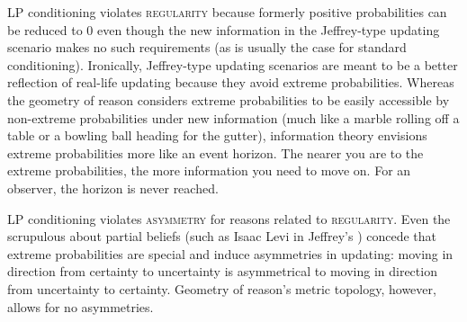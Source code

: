 \documentclass[11pt]{article} \usepackage{october}
\begin{document}
LP conditioning violates \textsc{regularity} because formerly positive
probabilities can be reduced to $0$ even though the new information in
the Jeffrey-type updating scenario makes no such requirements (as is
usually the case for standard conditioning). Ironically, Jeffrey-type
updating scenarios are meant to be a better reflection of real-life
updating because they avoid extreme probabilities. Whereas the
geometry of reason considers extreme probabilities to be easily
accessible by non-extreme probabilities under new information (much
like a marble rolling off a table or a bowling ball heading for the
gutter), information theory envisions extreme probabilities more like
an event horizon. The nearer you are to the extreme probabilities, the
more information you need to move on. For an observer, the horizon is
never reached.

LP conditioning violates \textsc{asymmetry} for reasons related to
\textsc{regularity}. Even the scrupulous about partial beliefs (such
as Isaac Levi in Jeffrey's ) concede that extreme probabilities are special
and induce asymmetries in updating: moving in direction from certainty
to uncertainty is asymmetrical to moving in direction from uncertainty
to certainty. Geometry of reason's metric topology, however, allows
for no asymmetries.

 
\end{document}
